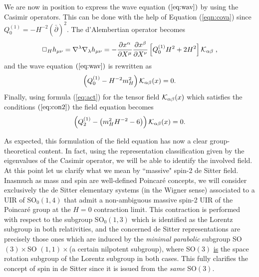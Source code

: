 \documentclass[a4paper,11pt,showpacs,preprintnumbers]{revtex4}
\begin{document}
We are now in position to express the wave equation
$(\ref{eq:wav})$ by using the Casimir operators. This can be done
with the help of Equation (\ref{eqn:cova}) since
$Q_{0}^{(1)}=-H^{-2}(\bar\partial)^2$. The d'Alembertian operator
becomes
\begin{equation}
\Box_{H}
h_{\mu\nu}=\nabla^{\lambda}\nabla_{\lambda}h_{\mu\nu}=-\frac{\partial
x^\alpha}{\partial X^\mu} \frac{\partial x^\beta}{\partial X^\nu}
\left[Q_{0}^{(1)}H^2+2H^2\right]{\cal K}_{\alpha\beta} \;,
\end{equation}
and the wave equation $(\ref{eq:wav})$ is rewritten as
\begin{equation}
\left(Q_{0}^{(1)}-H^{-2}m_H^2\right){\cal K}_{\alpha\beta}(x)=0.
\end{equation}
Finally, using formula (\ref{eq:act}) for the tensor field ${\cal
K}_{\alpha\beta}(x)$ which satisfies the conditions
$(\ref{eq:con2})$ the field equation becomes
\begin{equation}
\left( Q_{2}^{(1)}-\left( m^{2}_{H}H^{-2}-6\right) \right){\cal
K}_{\alpha\beta}(x)=0. \label{eq:wave}
\end{equation}

As expected, this formulation of the field equation has now a
clear group-theoretical content. In fact, using the representation
classification given by the eigenvalues of the Casimir operator,
we will be able to identify the involved field. At this point let
us clarify what we mean by ``massive" spin-2 de Sitter field.
Inasmuch as mass and  spin are well-defined Poincar\'e concepts,
we will consider exclusively  the de Sitter elementary systems (in
the Wigner sense) associated to a UIR of SO$_{0}(1,4)$ that admit
a non-ambiguous  massive spin-2 UIR of the Poincar\'e group at the
$H=0$ contraction limit. This contraction is performed with
respect to the  subgroup SO$_0(1,3)$ which is identified as the
Lorentz subgroup in both relativities, and the concerned de Sitter
representations are precisely those ones which are induced by the
{\it minimal parabolic} \cite{lipsman} subgroup SO$(3) \times $SO
$(1,1) \times$(a certain nilpotent subgroup), where SO$(3)$
\underline{is} the space rotation subgroup of the Lorentz subgroup
in both cases. This fully clarifies the concept of spin in de
Sitter since it is issued from the {\it same} SO$(3)$.
\end{document}
